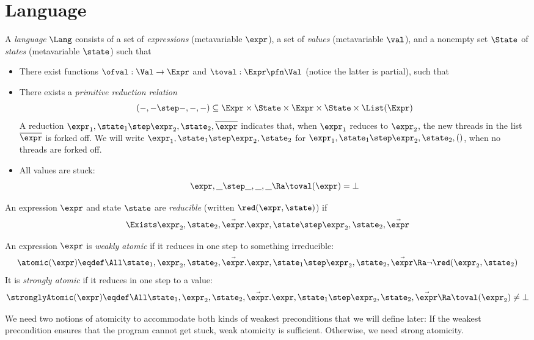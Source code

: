 \section{Language}
\label{sec:language}

A \emph{language} $\Lang$ consists of a set \Expr{} of \emph{expressions} (metavariable $\expr$), a set \Val{} of \emph{values} (metavariable $\val$), and a nonempty set $\State$ of \emph{states} (metavariable $\state$) such that
\begin{itemize}[itemsep=0pt]
\item There exist functions $\ofval : \Val \to \Expr$ and $\toval : \Expr \pfn \Val$ (notice the latter is partial), such that
\item There exists a \emph{primitive reduction relation} \[(-,- \step -,-,-) \subseteq \Expr \times \State \times \Expr \times \State \times \List(\Expr)\]
  A reduction $\expr_1, \state_1 \step \expr_2, \state_2, \overline\expr$ indicates that, when $\expr_1$ reduces to $\expr_2$, the new threads in the list $\overline\expr$ is forked off.
  We will write $\expr_1, \state_1 \step \expr_2, \state_2$ for $\expr_1, \state_1 \step \expr_2, \state_2, ()$, \ie when no threads are forked off. \\
\item All values are stuck:
\[ \expr, \_ \step  \_, \_, \_ \Ra \toval(\expr) = \bot \]
\end{itemize}

\begin{defn}
  An expression $\expr$ and state $\state$ are \emph{reducible} (written $\red(\expr, \state)$) if
  \[ \Exists \expr_2, \state_2, \vec\expr. \expr,\state \step \expr_2,\state_2,\vec\expr \]
\end{defn}

\begin{defn}
  An expression $\expr$ is \emph{weakly atomic} if it reduces in one step to something irreducible:
  \[ \atomic(\expr) \eqdef \All\state_1, \expr_2, \state_2, \vec\expr. \expr, \state_1 \step \expr_2, \state_2, \vec\expr \Ra \lnot \red(\expr_2, \state_2) \]
  It is \emph{strongly atomic} if it reduces in one step to a value:
  \[ \stronglyAtomic(\expr) \eqdef \All\state_1, \expr_2, \state_2, \vec\expr. \expr, \state_1 \step \expr_2, \state_2, \vec\expr \Ra \toval(\expr_2) \neq \bot \]
\end{defn}
We need two notions of atomicity to accommodate both kinds of weakest preconditions that we will define later:
If the weakest precondition ensures that the program cannot get stuck, weak atomicity is sufficient.
Otherwise, we need strong atomicity.

